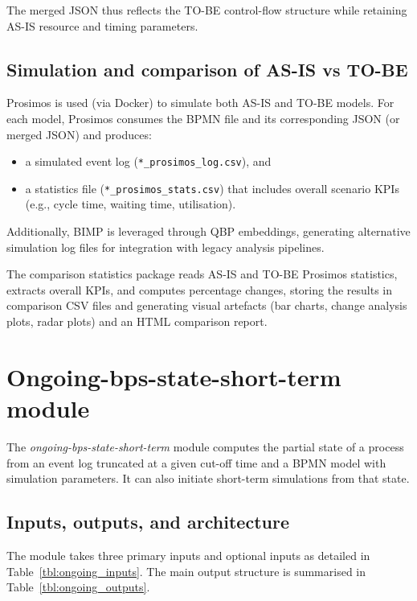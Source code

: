 \documentclass[a4paper,fleqn]{cas-sc}
\begin{document}
The merged JSON thus reflects the TO-BE control-flow structure
while retaining AS-IS resource and timing parameters.

\subsection{Simulation and comparison of AS-IS vs TO-BE}

Prosimos is used (via Docker) to simulate both AS-IS and TO-BE
models.  
For each model, Prosimos consumes the BPMN file and its
corresponding JSON (or merged JSON) and produces:

\begin{itemize}
  \item a simulated event log (\verb|*_prosimos_log.csv|), and
  \item a statistics file (\verb|*_prosimos_stats.csv|) that
  includes overall scenario KPIs (e.g., cycle time, waiting
  time, utilisation).
\end{itemize}

Additionally, BIMP is leveraged through QBP embeddings,
generating alternative simulation log files for integration
with legacy analysis pipelines.

The comparison statistics package reads AS-IS and TO-BE
Prosimos statistics, extracts overall KPIs, and computes
percentage changes, storing the results in comparison CSV files
and generating visual artefacts (bar charts, change analysis plots,
radar plots) and an HTML comparison report.

\section{Ongoing-bps-state-short-term module}
\label{app:ongoing_module}

The \emph{ongoing-bps-state-short-term} module computes the
partial state of a process from an event log truncated at a
given cut-off time and a BPMN model with simulation parameters.
It can also initiate short-term simulations from that state.

\subsection{Inputs, outputs, and architecture}

The module takes three primary inputs and optional inputs as
detailed in Table~\ref{tbl:ongoing_inputs}.
The main output structure is summarised in Table~\ref{tbl:ongoing_outputs}.
\end{document}
